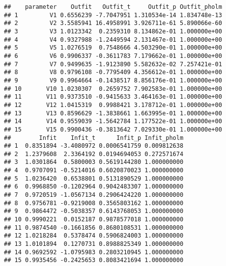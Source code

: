 \documentclass[
]{book}
\newenvironment{Shaded}{\begin{snugshade}}{\end{snugshade}}
\newcommand{\CommentTok}[1]{\textcolor[rgb]{0.56,0.35,0.01}{\textit{#1}}}
\newcommand{\NormalTok}[1]{#1}
\newcommand{\SpecialCharTok}[1]{\textcolor[rgb]{0.00,0.00,0.00}{#1}}
\begin{document}
\begin{Shaded}
\end{Shaded}

\begin{verbatim}
##    parameter    Outfit   Outfit_t     Outfit_p Outfit_pholm
## 1         V1 0.6556239 -7.7047951 1.310534e-14 1.834748e-13
## 2         V2 3.5585941 16.4958991 3.926711e-61 5.890066e-60
## 3         V3 1.0123342  0.2359310 8.134862e-01 1.000000e+00
## 4         V4 0.9327988 -1.2449594 2.131467e-01 1.000000e+00
## 5         V5 1.0276519  0.7548666 4.503290e-01 1.000000e+00
## 6         V6 0.9906337 -0.3611783 7.179662e-01 1.000000e+00
## 7         V7 0.9499635 -1.9123890 5.582632e-02 7.257421e-01
## 8         V8 0.9796108 -0.7795409 4.356612e-01 1.000000e+00
## 9         V9 0.9964664 -0.1438517 8.856176e-01 1.000000e+00
## 10       V10 1.0230307  0.2659752 7.902583e-01 1.000000e+00
## 11       V11 0.9373510 -0.9415633 3.464163e-01 1.000000e+00
## 12       V12 1.0415319  0.9988421 3.178712e-01 1.000000e+00
## 13       V13 0.8596629 -1.3838661 1.663995e-01 1.000000e+00
## 14       V14 0.9559039 -1.5642784 1.177522e-01 1.000000e+00
## 15       V15 0.9900436 -0.3813642 7.029330e-01 1.000000e+00
##        Infit    Infit_t      Infit_p Infit_pholm
## 1  0.8351894 -3.4080972 0.0006541759 0.009812638
## 2  1.2379608  2.3364192 0.0194694053 0.272571674
## 3  1.0301864  0.5800003 0.5619144280 1.000000000
## 4  0.9707091 -0.5214016 0.6020870023 1.000000000
## 5  1.0236420  0.6538801 0.5131890529 1.000000000
## 6  0.9968850 -0.1202964 0.9042483307 1.000000000
## 7  0.9720519 -1.0567134 0.2906424220 1.000000000
## 8  0.9756781 -0.9219008 0.3565803162 1.000000000
## 9  0.9864472 -0.5038357 0.6143768053 1.000000000
## 10 0.9990221  0.0152187 0.9878577018 1.000000000
## 11 0.9874540 -0.1661856 0.8680108531 1.000000000
## 12 1.0218284  0.5378474 0.5906824003 1.000000000
## 13 1.0101894  0.1270731 0.8988825349 1.000000000
## 14 0.9692592 -1.0795983 0.2803210945 1.000000000
## 15 0.9935456 -0.2425653 0.8083421694 1.000000000
\end{verbatim}

\begin{Shaded}
\end{Shaded}
\end{document}
